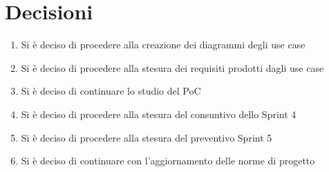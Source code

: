\documentclass[a4paper,12pt]{article}
\begin{document}
\section{Decisioni}
\begin{enumerate}[noitemsep]
    \item Si è deciso di procedere alla creazione dei diagrammi degli use case
    \item Si è deciso di procedere alla stesura dei requisiti prodotti dagli use case
    \item Si è deciso di continuare lo studio del PoC
    \item Si è deciso di procedere alla stesura del consuntivo dello Sprint 4 
    \item Si è deciso di procedere alla stesura del preventivo Sprint 5
    \item Si è deciso di continuare con l'aggiornamento delle norme di progetto
\end{enumerate}
\end{document}
